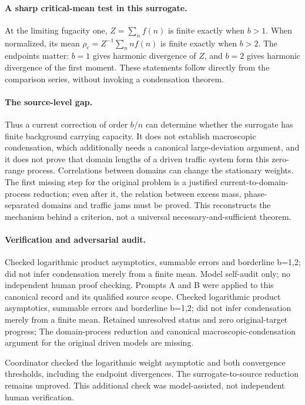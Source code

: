 \documentclass[11pt]{article}
\begin{document}
\paragraph{A sharp critical-mean test in this surrogate.} At the limiting fugacity one, $Z=\sum_nf(n)$ is finite exactly when $b>1$. When normalized, its mean $\rho_c=Z^{-1}\sum_nnf(n)$ is finite exactly when $b>2$. The endpoints matter: $b=1$ gives harmonic divergence of $Z$, and $b=2$ gives harmonic divergence of the first moment. These statements follow directly from the comparison series, without invoking a condensation theorem.

\paragraph{The source-level gap.} Thus a current correction of order $b/n$ can determine whether the surrogate has finite background carrying capacity. It does not establish macroscopic condensation, which additionally needs a canonical large-deviation argument, and it does not prove that domain lengths of a driven traffic system form this zero-range process. Correlations between domains can change the stationary weights. The first missing step for the original problem is a justified current-to-domain-process reduction; even after it, the relation between excess mass, phase-separated domains and traffic jams must be proved. This reconstructs the mechanism behind a criterion, not a universal necessary-and-sufficient theorem.

\paragraph{Verification and adversarial audit.}
Checked logarithmic product asymptotics, summable errors and borderline b=1,2; did not infer condensation merely from a finite mean. Model self-audit only; no independent human proof checking. Prompts A and B were applied to this canonical record and its qualified source scope. Checked logarithmic product asymptotics, summable errors and borderline b=1,2; did not infer condensation merely from a finite mean. Retained unresolved status and zero original-target progress; The domain-process reduction and canonical macroscopic-condensation argument for the original driven models are missing.

Coordinator checked the logarithmic weight asymptotic and both convergence thresholds, including the endpoint divergences. The surrogate-to-source reduction remains unproved. This additional check was model-assisted, not independent human verification.
\end{document}
